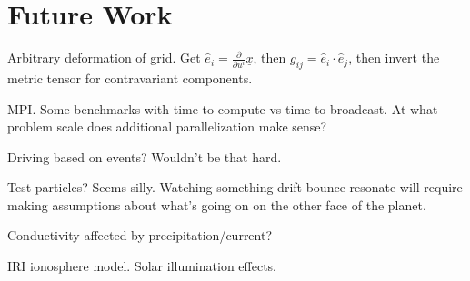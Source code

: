 
\section{Future Work}

Arbitrary deformation of grid. Get $\hat{e}_i = \frac{\partial}{\partial u^i} \underline{x}$, then $g_{ij} = \hat{e}_i \cdot \hat{e}_j$, then invert the metric tensor for contravariant components.  

MPI. Some benchmarks with time to compute vs time to broadcast. At what problem scale does additional parallelization make sense? 

Driving based on events? Wouldn't be that hard. 

Test particles? Seems silly. Watching something drift-bounce resonate will require making assumptions about what's going on on the other face of the planet.  

Conductivity affected by precipitation/current? 

IRI ionosphere model. Solar illumination effects. 
